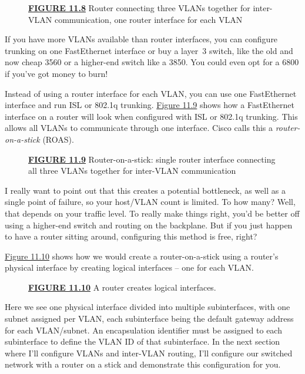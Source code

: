 \begin{figure}
\centering
\caption{{\protect\hyperlink{c11.xhtmlux5cux23figureanchor11-8}{\textbf{FIGURE
11.8}} Router connecting three VLANs together for inter-VLAN
communication, one router interface for each VLAN}}
\end{figure}

If you have more VLANs available than router interfaces, you can
configure trunking on one FastEthernet interface or buy a layer~3
switch, like the old and now cheap 3560 or a higher-end switch like a
3850. You could even opt for a 6800 if you've got money to burn!

Instead of using a router interface for each VLAN, you can use one
FastEthernet interface and run ISL or 802.1q trunking.
\protect\hyperlink{c11.xhtmlux5cux23figure11-9}{Figure 11.9} shows how a
FastEthernet interface on a
router will look when
configured with ISL or 802.1q trunking. This allows all VLANs to
communicate through one interface. Cisco calls this a \emph{router-on-a-stick}
(ROAS).

\begin{figure}
\centering
\caption{{\protect\hyperlink{c11.xhtmlux5cux23figureanchor11-9}{\textbf{FIGURE
11.9}} Router-on-a-stick: single router interface connecting all three
VLANs together for inter-VLAN communication}}
\end{figure}

I really want to point out that this creates a potential bottleneck, as
well as a single point of failure, so your host/VLAN count is limited.
To how many? Well, that depends on your traffic level. To really make
things right, you'd be better off using a higher-end switch and routing
on the backplane. But if you just happen to have a router sitting
around, configuring this method is free, right?

\protect\hyperlink{c11.xhtmlux5cux23figure11-10}{Figure 11.10} shows how
we would create a router-on-a-stick using a router's physical interface
by creating logical interfaces -- one for each VLAN.

\begin{figure}
\centering
\caption{{\protect\hyperlink{c11.xhtmlux5cux23figureanchor11-10}{\textbf{FIGURE
11.10}} A router creates logical interfaces.}}
\end{figure}

Here we see one physical interface divided into multiple subinterfaces,
with one subnet assigned per VLAN, each subinterface being the default
gateway address for each VLAN/subnet. An encapsulation identifier must
be assigned to each subinterface to define the VLAN ID of that
subinterface. In the next section where I'll configure VLANs and
inter-VLAN routing, I'll configure our switched network with a router on
a stick and demonstrate this configuration for you.

